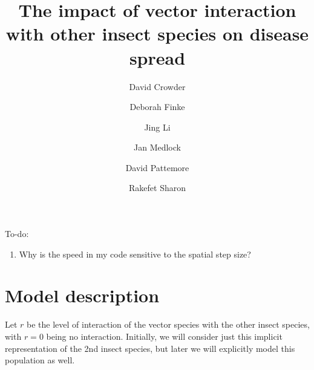 \documentclass{jpmarticle}
\title{The impact of vector interaction with other insect species on
  disease spread}
\author{
  David Crowder
  \and
  Deborah Finke
  \and
  Jing Li
  \and
  Jan Medlock
  \and
  David Pattemore
  \and
  Rakefet Sharon
}
\begin{document}
\maketitle

To-do:
\begin{enumerate}
\item Why is the speed in my code sensitive to the spatial step size?
\end{enumerate}


\section{Model description}

Let $r$ be the level of interaction of the vector species with the
other insect species, with $r = 0$ being no interaction.  Initially,
we will consider just this implicit representation of the 2nd insect
species, but later we will explicitly model this population as well.
\end{document}
